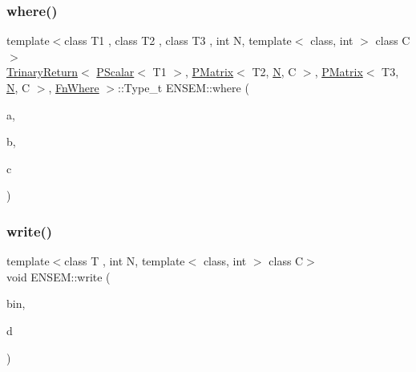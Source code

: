 \subsubsection{\texorpdfstring{where()}{where()}}
{\footnotesize\ttfamily template$<$class T1 , class T2 , class T3 , int N, template$<$ class, int $>$ class C$>$ \\
\mbox{\hyperlink{structENSEM_1_1TrinaryReturn}{Trinary\+Return}}$<$ \mbox{\hyperlink{classENSEM_1_1PScalar}{P\+Scalar}}$<$ T1 $>$, \mbox{\hyperlink{classENSEM_1_1PMatrix}{P\+Matrix}}$<$ T2, \mbox{\hyperlink{adat__devel_2lib_2hadron_2operator__name__util_8cc_a7722c8ecbb62d99aee7ce68b1752f337}{N}}, C $>$, \mbox{\hyperlink{classENSEM_1_1PMatrix}{P\+Matrix}}$<$ T3, \mbox{\hyperlink{adat__devel_2lib_2hadron_2operator__name__util_8cc_a7722c8ecbb62d99aee7ce68b1752f337}{N}}, C $>$, \mbox{\hyperlink{structENSEM_1_1FnWhere}{Fn\+Where}} $>$\+::Type\+\_\+t E\+N\+S\+E\+M\+::where (\begin{DoxyParamCaption}\item[{const \mbox{\hyperlink{classENSEM_1_1PScalar}{P\+Scalar}}$<$ T1 $>$ \&}]{a,  }\item[{const \mbox{\hyperlink{classENSEM_1_1PMatrix}{P\+Matrix}}$<$ T2, \mbox{\hyperlink{adat__devel_2lib_2hadron_2operator__name__util_8cc_a7722c8ecbb62d99aee7ce68b1752f337}{N}}, C $>$ \&}]{b,  }\item[{const \mbox{\hyperlink{classENSEM_1_1PMatrix}{P\+Matrix}}$<$ T3, \mbox{\hyperlink{adat__devel_2lib_2hadron_2operator__name__util_8cc_a7722c8ecbb62d99aee7ce68b1752f337}{N}}, C $>$ \&}]{c }\end{DoxyParamCaption})\hspace{0.3cm}{\ttfamily [inline]}}

\mbox{\label{group__primmatrix_ga7255316b449512a4081c99a02e485e4c}} 
\subsubsection{\texorpdfstring{write()}{write()}}
{\footnotesize\ttfamily template$<$class T , int N, template$<$ class, int $>$ class C$>$ \\
void E\+N\+S\+E\+M\+::write (\begin{DoxyParamCaption}\item[{\mbox{\hyperlink{classADATIO_1_1BinaryWriter}{A\+D\+A\+T\+I\+O\+::\+Binary\+Writer}} \&}]{bin,  }\item[{const \mbox{\hyperlink{classENSEM_1_1PMatrix}{P\+Matrix}}$<$ T, \mbox{\hyperlink{adat__devel_2lib_2hadron_2operator__name__util_8cc_a7722c8ecbb62d99aee7ce68b1752f337}{N}}, C $>$ \&}]{d }\end{DoxyParamCaption})\hspace{0.3cm}{\ttfamily [inline]}}




